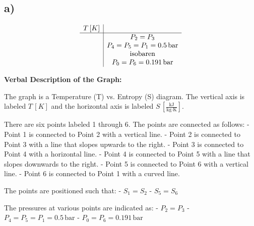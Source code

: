 

\subsection*{a)}

\[
\begin{array}{c}
\begin{array}{c|c}
T \, [K] & \\
\hline
& P_2 = P_3 \\
& P_4 = P_5 = P_1 = 0.5 \, \text{bar} \\
& \text{isobaren} \\
& P_0 = P_6 = 0.191 \, \text{bar} \\
\end{array}
\end{array}
\]

\noindent
\textbf{Verbal Description of the Graph:}

The graph is a Temperature (T) vs. Entropy (S) diagram. The vertical axis is labeled \( T \, [K] \) and the horizontal axis is labeled \( S \, \left[ \frac{\text{kJ}}{\text{kg} \cdot \text{K}} \right] \). 

There are six points labeled 1 through 6. The points are connected as follows:
- Point 1 is connected to Point 2 with a vertical line.
- Point 2 is connected to Point 3 with a line that slopes upwards to the right.
- Point 3 is connected to Point 4 with a horizontal line.
- Point 4 is connected to Point 5 with a line that slopes downwards to the right.
- Point 5 is connected to Point 6 with a vertical line.
- Point 6 is connected to Point 1 with a curved line.

The points are positioned such that:
- \( S_1 = S_2 \)
- \( S_5 = S_6 \)

The pressures at various points are indicated as:
- \( P_2 = P_3 \)
- \( P_4 = P_5 = P_1 = 0.5 \, \text{bar} \)
- \( P_0 = P_6 = 0.191 \, \text{bar} \)